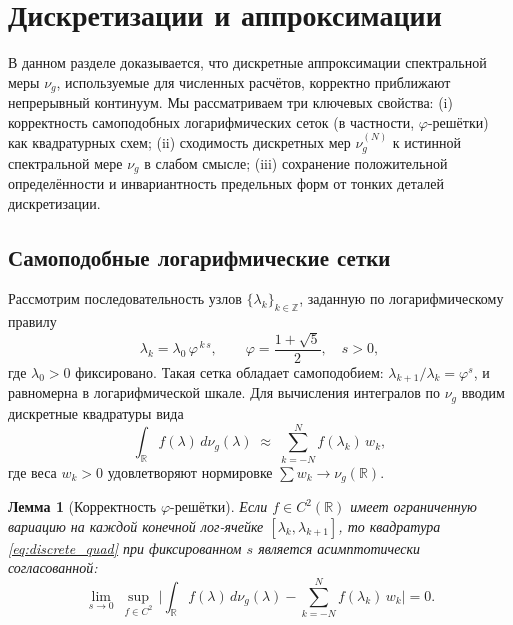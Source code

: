 \documentclass{article}
\numberwithin{equation}{section}
\theoremstyle{plain}
\newtheorem{lemma}{Лемма}
\theoremstyle{definition}
\theoremstyle{remark}
\begin{document}
\clearpage

\section{Дискретизации и аппроксимации}
\label{sec:discretization}

\noindent
В данном разделе доказывается, что дискретные аппроксимации спектральной меры $\nu_g$,
используемые для численных расчётов, корректно приближают непрерывный континуум.
Мы рассматриваем три ключевых свойства:
(i) корректность самоподобных логарифмических сеток (в частности, $\varphi$-решётки)
как квадратурных схем;
(ii) сходимость дискретных мер $\nu_g^{(N)}$ к истинной спектральной мере $\nu_g$
в слабом смысле;
(iii) сохранение положительной определённости и инвариантность предельных форм
от тонких деталей дискретизации.

\subsection{Самоподобные логарифмические сетки}
\label{subsec:log_lattices}

Рассмотрим последовательность узлов $\{\lambda_k\}_{k\in\mathbb Z}$, заданную по логарифмическому правилу
\begin{equation}
\label{eq:phi_lattice}
\lambda_k = \lambda_0\,\varphi^{\,k\,s},\qquad \varphi=\frac{1+\sqrt{5}}{2},\quad s>0,
\end{equation}
где $\lambda_0>0$ фиксировано. Такая сетка обладает самоподобием:
$\lambda_{k+1}/\lambda_k=\varphi^s$, и равномерна в логарифмической шкале.
Для вычисления интегралов по $\nu_g$ вводим дискретные квадратуры вида
\begin{equation}
\label{eq:discrete_quad}
\int_{\mathbb R} f(\lambda)\,d\nu_g(\lambda)
\;\approx\;
\sum_{k=-N}^{N} f(\lambda_k)\,w_k,
\end{equation}
где веса $w_k>0$ удовлетворяют нормировке $\sum w_k \to \nu_g(\mathbb R)$.

\begin{lemma}[Корректность $\varphi$-решётки]
\label{lem:phi_quadrature}
Если $f\in C^2(\mathbb R)$ имеет ограниченную вариацию на каждой конечной лог-ячейке
$[\lambda_k,\lambda_{k+1}]$, то квадратура \eqref{eq:discrete_quad} при фиксированном $s$
является \emph{асимптотически согласованной}:
\begin{equation}
\label{eq:phi_consistency}
\lim_{s\to0}\ \sup_{f\in C^2}\,
\Bigg|\int_{\mathbb R}\!f(\lambda)\,d\nu_g(\lambda)
-\sum_{k=-N}^{N}\! f(\lambda_k)\,w_k\Bigg| = 0.
\end{equation}
\end{lemma}
\end{document}
